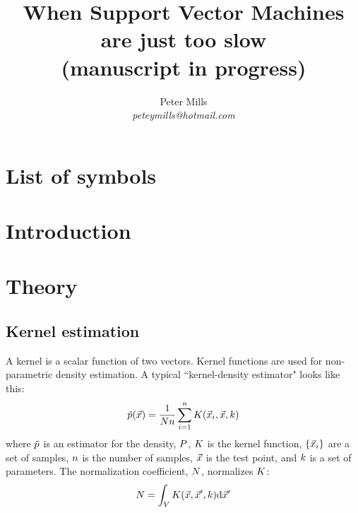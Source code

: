 \documentclass[11pt]{article}
\begin{document}
\title{When Support Vector Machines are just too slow\\(manuscript in progress)}

\author{Peter Mills\\\textit{peteymills@hotmail.com}}

\maketitle



\tableofcontents

\section*{List of symbols}



\section{Introduction}

\section{Theory}

\subsection{Kernel estimation}

A kernel is a scalar function of two vectors. Kernel functions are used for 
non-parametric density estimation. A typical ``kernel-density estimator"
looks like this:
\begin{equation}
	\tilde p(\vec {x}) = \frac {1}{N n} \sum_{i=1}^n K(\vec {x}_i, \vec {x}, k)
\end{equation}
where $\tilde p$ is an estimator for the density, $P$, 
$K$ is the kernel function,
$\lbrace \vec {x}_i \rbrace$ are a set of samples, 
$n$ is the number of samples,
$\vec {x}$ is the test point,
and $k$ is a set of parameters. 
The normalization coefficient, $N$, normalizes $K$:
\begin{equation}
	N = \int_V K(\vec {x}, \vec {x}^\prime, k) \mathrm d \vec {x}^\prime
\end{equation}
\end{document}

